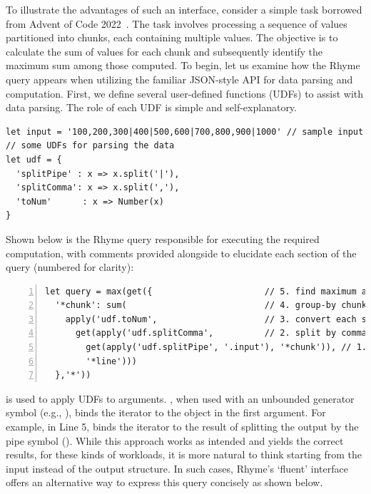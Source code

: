 \documentclass[runningheads]{llncs}
\newcommand{\lang}{Rhyme}
\begin{document}
To illustrate the advantages of such an interface, consider a
simple task borrowed from Advent of Code 2022~\cite{adventofcode22}.
The task involves processing a sequence of values partitioned into chunks,
each containing multiple values.
The objective is to calculate the sum of values for each chunk and
subsequently identify the maximum sum among those computed.
To begin, let us examine how the \lang{} query appears when utilizing
the familiar JSON-style API for data parsing and computation.
First, we define several user-defined functions (UDFs) to assist with data parsing.
The role of each UDF is simple and self-explanatory.

\begin{lstlisting}[style=JavaScript, columns=flexible]
let input = '100,200,300|400|500,600|700,800,900|1000' // sample input
// some UDFs for parsing the data
let udf = {
  'splitPipe' : x => x.split('|'),
  'splitComma': x => x.split(','),
  'toNum'      : x => Number(x)
}
\end{lstlisting}

Shown below is the \lang{} query responsible for executing the required
computation, with comments provided alongside to elucidate each section
of the query (numbered for clarity):

\begin{lstlisting}[style=JavaScript, columns=flexible, numbers=left]
let query = max(get({                      // 5. find maximum among group sums
  '*chunk': sum(                           // 4. group-by chunk and compute sum
    apply('udf.toNum',                     // 3. convert each string number to a number object
      get(apply('udf.splitComma',          // 2. split by comma to get numbers of each chunk
        get(apply('udf.splitPipe', '.input'), '*chunk')), // 1. split into chunks
        '*line')))
  },'*'))
\end{lstlisting}

 is used to apply UDFs to arguments.
, when used with an unbounded generator symbol (e.g., ), binds the
iterator to the object in the first argument.
For example, in Line 5,  binds the iterator
 to the result of splitting the output by the pipe symbol (\inline{|}).
While this approach works as intended and yields the correct results, 
for these kinds of workloads, it is more natural to think starting from the input
instead of the output structure.
In such cases, \lang{}'s `fluent' interface offers an alternative way to express
this query concisely as shown below.
\end{document}

